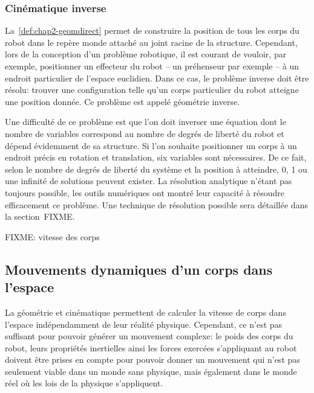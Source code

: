 \subsubsection{Cinématique inverse}

La \autoref{def:chap2-geomdirect} permet de construire la position de
tous les corps du robot dans le repère monde attaché au joint racine
de la structure. Cependant, lors de la conception d'un problème
robotique, il est courant de vouloir, par exemple, positionner un
effecteur du robot -- un préhenseur par exemple -- à un endroit
particulier de l'espace euclidien. Dans ce cas, le problème inverse
doit être résolu: trouver une configuration telle qu'un corps
particulier du robot atteigne une position donnée. Ce problème est
appelé géométrie inverse.


Une difficulté de ce problème est que l'on doit inverser une équation
dont le nombre de variables correspond au nombre de degrés de liberté
du robot et dépend évidemment de sa structure. Si l'on souhaite
positionner un corps à un endroit précis en rotation et translation,
six variables sont nécessaires. De ce fait, selon le nombre de degrés
de liberté du système et la position à atteindre, 0, 1 ou une infinité
de solutions peuvent exister. La résolution analytique n'étant pas
toujours possible, les outils numériques ont montré leur capacité à
résoudre efficacement ce problème. Une technique de résolution
possible sera détaillée dans la section FIXME.

FIXME: vitesse des corps

\subsection{Mouvements dynamiques d'un corps dans l'espace}

La géométrie et cinématique permettent de calculer la vitesse de corps
dans l'espace indépendamment de leur réalité physique. Cependant, ce
n'est pas suffisant pour pouvoir générer un mouvement complexe: le
poids des corps du robot, leurs propriétés inertielles ainsi les
forces exercées s'appliquant au robot doivent être prises en compte
pour pouvoir donner un mouvement qui n'est pas seulement viable dans
un monde sans physique, mais également dans le monde réel où les lois
de la physique s'appliquent.

